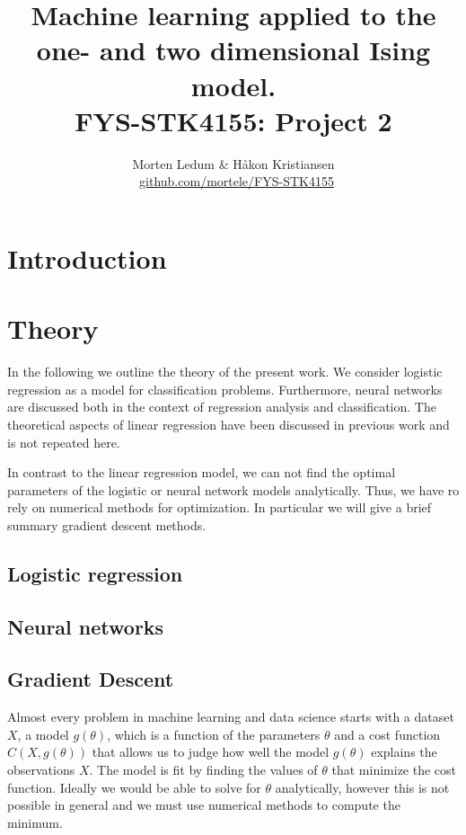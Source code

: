 \documentclass[a4paper, twocolumn]{article}
\title{{\sc Machine learning applied to the one- and two dimensional Ising model. \\ {\large FYS-STK4155: Project 2}}}
\author{Morten Ledum \& Håkon Kristiansen \\ \faGithub \ {\small \href{https://github.com/mortele/FYS-STK4155/tree/master/project2}{github.com/mortele/FYS-STK4155}}}
\begin{document}
\twocolumn[
  \begin{@twocolumnfalse}
\maketitle

\begin{abstract}

\end{abstract}

\tableofcontents 
  \end{@twocolumnfalse}
]

\newpage

\section{Introduction}
\lipsum[1]
\autocite{trevor2009elements}
\section{Theory}
In the following we outline the theory of the present work. We 
consider logistic regression as a model for classification problems. Furthermore, neural networks are discussed 
both in the context of regression analysis and classification. The theoretical aspects of linear regression have been 
discussed in previous work and is not repeated here.

In contrast to the linear regression model, we can not find the optimal parameters of the logistic or neural network 
models analytically. Thus, we have ro rely on numerical methods for optimization. In particular we will give a brief summary
gradient descent methods.

\subsection{Logistic regression}
\lipsum[3]
\subsection{Neural networks}
\lipsum[4]

\subsection{Gradient Descent}
Almost every problem in machine learning and data science starts
with a dataset $X$, a model $g(\theta)$, which is a function of the parameters $\theta$ and a cost 
function $C(X, g(\theta))$ that allows us to judge how well the
model $g(\theta)$ explains the observations $X$. The model is fit by finding the values of $\theta$ that minimize the 
cost function. Ideally we would be able to solve for $\theta$ analytically, however this is not possible in general and 
we must use numerical methods to compute the minimum.
\end{document}

